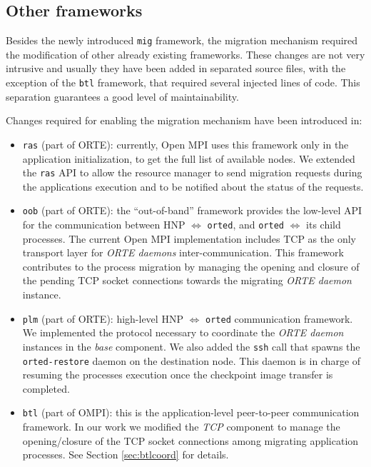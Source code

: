 \subsection{Other frameworks}
Besides the newly introduced \texttt{mig} framework, the migration mechanism
required the modification of other already existing frameworks.
These changes are not very
intrusive and usually they have been added in separated source files, with the exception of the
\texttt{btl} framework, that required several injected lines of code.
This separation guarantees a good level of maintainability.

Changes required for enabling the migration mechanism have been introduced in:
\begin{itemize}
\item \texttt{ras} (part of ORTE): currently, Open MPI uses
this framework only in the application initialization, to get the full list
of available nodes.
We extended the \texttt{ras} API to allow the resource manager to send
migration requests during the applications execution and to be notified
about the status of the requests.

\item \texttt{oob} (part of ORTE): the ``out-of-band'' framework provides the
low-level API for the communication between HNP $\Leftrightarrow$
\texttt{orted}, and \texttt{orted} $\Leftrightarrow$ its child processes.
The current Open MPI implementation includes TCP as the only transport layer for
\emph{ORTE daemons} inter-communication. This framework contributes to the
process migration by managing the opening and closure of the pending
TCP socket connections towards the migrating \emph{ORTE daemon} instance.

\item \texttt{plm} (part of ORTE): high-level HNP
$\Leftrightarrow$ \texttt{orted} communication framework. We implemented
the protocol necessary to coordinate the \emph{ORTE daemon} instances in the \emph{base}
component. We also added the \texttt{ssh} call that spawns the \texttt
{orted-restore} daemon on the destination node. This daemon is in charge of
resuming the processes execution once the checkpoint image transfer is
completed.

\item \texttt{btl} (part of OMPI): this is the application-level peer-to-peer
communication framework. In our work we modified the \emph{TCP} component to
manage the opening/closure of the TCP socket connections among migrating
application processes. See Section \ref{sec:btlcoord} for details.

\end{itemize}


